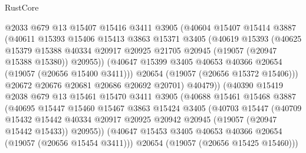 \begin{lexlean}{RustCore}
\begin{coremodule}
                      @2033
                      @679
                      @13
                      @15407
                      @15416
                      @3411
                      @3905
                      (@40604
                        @15407
                        @15414
                        @3887
                        (@40611
                          @15393
                          @15406
                          @15413
                          @3863
                          @15371
                          @3405
                          (@40619
                            @15393
                            (@40625
                              @15379
                              @15388
                              @40334
                              @20917
                              @20925
                              @21705
                              @20945
                              (@19057 (@20947 @15388 @15380))
                              @20955))
                          (@40647 @15399 @3405 @40653 @40366 @20654 (@19057 (@20656 @15400 @3411)))
                          @20654
                          (@19057 (@20656 @15372 @15406)))
                        @20672
                        @20676
                        @20681
                        @20686
                        @20692
                        @20701)
                      @40479))
                  (@40390
                    @15419
                    @2038
                    @679
                    @13
                    @15461
                    @15470
                    @3411
                    @3905
                    (@40688
                      @15461
                      @15468
                      @3887
                      (@40695
                        @15447
                        @15460
                        @15467
                        @3863
                        @15424
                        @3405
                        (@40703
                          @15447
                          (@40709
                            @15432
                            @15442
                            @40334
                            @20917
                            @20925
                            @20942
                            @20945
                            (@19057 (@20947 @15442 @15433))
                            @20955))
                        (@40647 @15453 @3405 @40653 @40366 @20654 (@19057 (@20656 @15454 @3411)))
                        @20654
                        (@19057 (@20656 @15425 @15460)))

\end{coremodule}
\end{lexlean}
